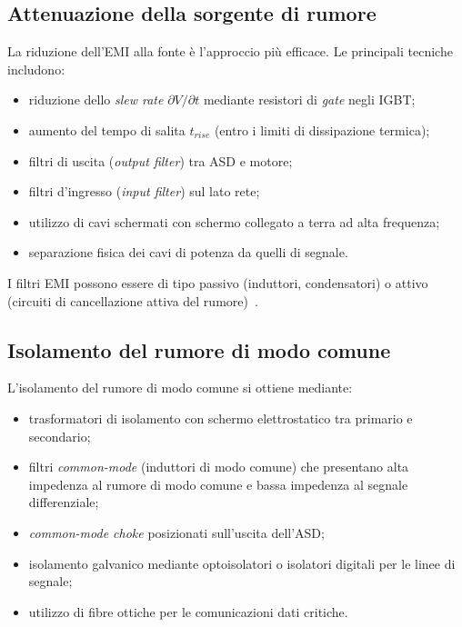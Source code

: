 \subsection{Attenuazione della sorgente di rumore}

La riduzione dell'EMI alla fonte è l'approccio più efficace. Le principali tecniche includono:

\begin{itemize}
\item riduzione dello \textit{slew rate} $\partial V/\partial t$ mediante resistori di \textit{gate} negli IGBT;
\item aumento del tempo di salita $t_{rise}$ (entro i limiti di dissipazione termica);
\item filtri di uscita (\textit{output filter}) tra ASD e motore;
\item filtri d'ingresso (\textit{input filter}) sul lato rete;
\item utilizzo di cavi schermati con schermo collegato a terra ad alta frequenza;
\item separazione fisica dei cavi di potenza da quelli di segnale.
\end{itemize}

I filtri EMI possono essere di tipo passivo (induttori, condensatori) o attivo (circuiti di cancellazione attiva del rumore)~\cite{wang2008, xiang1998, julian1998}.

\subsection{Isolamento del rumore di modo comune}

L'isolamento del rumore di modo comune si ottiene mediante:

\begin{itemize}
\item trasformatori di isolamento con schermo elettrostatico tra primario e secondario;
\item filtri \textit{common-mode} (induttori di modo comune) che presentano alta impedenza al rumore di modo comune e bassa impedenza al segnale differenziale;
\item \textit{common-mode choke} posizionati sull'uscita dell'ASD;
\item isolamento galvanico mediante optoisolatori o isolatori digitali per le linee di segnale;
\item utilizzo di fibre ottiche per le comunicazioni dati critiche.
\end{itemize}

